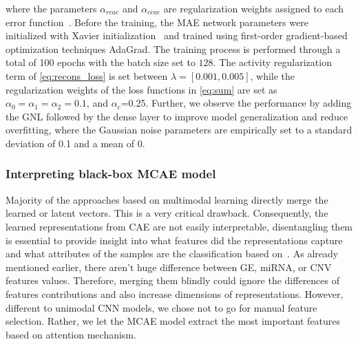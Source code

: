\hspace*{3.5mm} where the parameters $\alpha_{rcae}$ and $\alpha_{ccae}$ are regularization weights assigned to each error function~\cite{mmdcae}. Before the training, the MAE network parameters were initialized with Xavier initialization~\cite{xavier} and trained using first-order gradient-based optimization techniques AdaGrad. The training process is performed through a total of 100 epochs with the batch size set to $128$. The activity regularization term of \cref{eq:recons_loss} is set between $\lambda=[0.001, 0.005]$, while the regularization weights of the loss functions in \cref{eq:sum} are set as  $\alpha_{0}=\alpha_{1}=\alpha_{2}=0.1$, and $\alpha_{c}$=0.25. %
Further, we observe the performance by adding the GNL followed by the dense layer to improve model generalization and reduce overfitting, where the Gaussian noise parameters are empirically set to a standard deviation of 0.1 and a mean of 0. 

\subsubsection{Interpreting black-box MCAE model}
Majority of the approaches based on multimodal learning directly merge the learned or latent vectors. This is a very critical drawback. Consequently, the learned representations from CAE are not easily interpretable, disentangling them is essential to provide insight into what features did the representations capture and what attributes of the samples are the classification based on~\cite{karimTCBB2020}. As already mentioned earlier, there aren't huge difference between GE, miRNA, or CNV features values. Therefore, merging them blindly could ignore the differences of features contributions and also increase dimensions of representations. However, different to unimodal CNN models, we chose not to go for manual feature selection. Rather, we let the MCAE model extract the most important features based on attention mechanism. 

